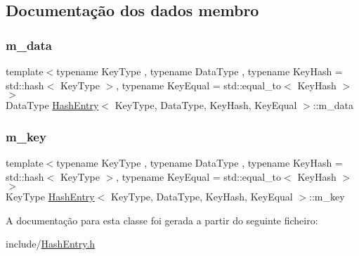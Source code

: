 \subsection{Documentação dos dados membro}
\mbox{\label{classHashEntry_aad378adf91322196c55be012d2fb2371}} 
\subsubsection{\texorpdfstring{m\+\_\+data}{m\_data}}
{\footnotesize\ttfamily template$<$typename Key\+Type , typename Data\+Type , typename Key\+Hash  = std\+::hash$<$ Key\+Type $>$, typename Key\+Equal  = std\+::equal\+\_\+to$<$ Key\+Hash $>$$>$ \\
Data\+Type \hyperlink{classHashEntry}{Hash\+Entry}$<$ Key\+Type, Data\+Type, Key\+Hash, Key\+Equal $>$\+::m\+\_\+data}

\mbox{\label{classHashEntry_a244e0393cbbe8a50f96f280fdbbaf311}} 
\subsubsection{\texorpdfstring{m\+\_\+key}{m\_key}}
{\footnotesize\ttfamily template$<$typename Key\+Type , typename Data\+Type , typename Key\+Hash  = std\+::hash$<$ Key\+Type $>$, typename Key\+Equal  = std\+::equal\+\_\+to$<$ Key\+Hash $>$$>$ \\
Key\+Type \hyperlink{classHashEntry}{Hash\+Entry}$<$ Key\+Type, Data\+Type, Key\+Hash, Key\+Equal $>$\+::m\+\_\+key}



A documentação para esta classe foi gerada a partir do seguinte ficheiro\+:\begin{DoxyCompactItemize}
\item 
include/\hyperlink{HashEntry_8h}{Hash\+Entry.\+h}\end{DoxyCompactItemize}
